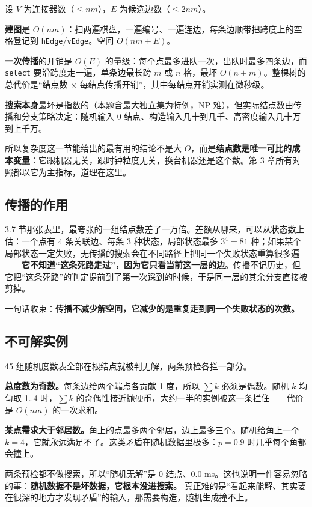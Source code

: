\documentclass[12pt,a4paper,fontset=windows]{ctexart}
\newcommand{\code}[1]{\texttt{#1}}
\begin{document}
设 $V$ 为连接器数（$\le nm$），$E$ 为候选边数（$\le 2nm$）。

\textbf{建图}是 $O(nm)$：扫两遍棋盘，一遍编号、一遍连边，每条边顺带把跨度上的空格登记到 \code{hEdge}/\code{vEdge}。空间 $O(nm+E)$。

\textbf{一次传播}的开销是 $O(E)$ 的量级：每个点最多进队一次，出队时最多四条边，而 \code{select} 要沿跨度走一遍，单条边最长跨 $m$ 或 $n$ 格，最坏 $O(n+m)$。整棵树的总代价是“结点数 × 每结点传播开销”，其中每结点开销实测在微秒级。

\textbf{搜索本身}最坏是指数的（本题含最大独立集为特例，NP 难），但实际结点数由传播和分支策略决定：随机输入 0 结点、构造输入几十到几千、高密度输入几十万到上千万。

所以复杂度这一节能给出的最有用的结论不是大 $O$，而是\textbf{结点数是唯一可比的成本变量}：它跟机器无关，跟时钟粒度无关，换台机器还是这个数。第 3 章所有对照都以它为主指标，道理在这里。

\subsection{传播的作用}

3.7 节那张表里，最夸张的一组结点数差了一万倍。差额从哪来，可以从状态数上估：一个点有 4 条关联边、每条 3 种状态，局部状态最多 $3^4=81$ 种；如果某个局部状态一定失败，无传播的搜索会在不同路径上把同一个失败状态重算很多遍——\textbf{它不知道“这条死路走过”，因为它只看当前这一层的边}。传播不记历史，但它把“这条死路”的判定提前到了第一次踩到的时候，于是同一层的其余分支直接被剪掉。

一句话收束：\textbf{传播不减少解空间，它减少的是重复走到同一个失败状态的次数。}

\subsection{不可解实例}

45 组随机度数表全部在根结点就被判无解，两条预检各拦一部分。

\textbf{总度数为奇数。}每条边给两个端点各贡献 1 度，所以 $\sum k$ 必须是偶数。随机 $k$ 均匀取 1..4 时，$\sum k$ 的奇偶性接近抛硬币，大约一半的实例被这一条拦住——代价是 $O(nm)$ 的一次求和。

\textbf{某点需求大于邻居数。}角上的点最多两个邻居，边上最多三个。随机给角上一个 $k=4$，它就永远满足不了。这类矛盾在随机数据里极多：$p=0.9$ 时几乎每个角都会撞上。

两条预检都不做搜索，所以“随机无解”是 0 结点、0.0 ms。这也说明一件容易忽略的事：\textbf{随机数据不是坏数据，它根本没进搜索。} 真正难的是“看起来能解、其实要在很深的地方才发现矛盾”的输入，那需要构造，随机生成撞不上。
\end{document}
